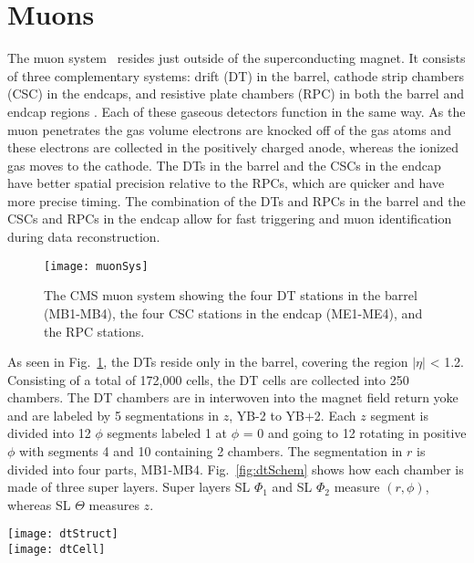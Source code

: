   \section{Muons}
    The muon system~\cite{tCmsE} resides just outside of the superconducting magnet.
    It consists of three complementary systems: drift \DIFdelbegin {}\DIFdelend \DIFaddbegin {}\DIFaddend (DT) in the
      barrel, cathode strip chambers (CSC) in the endcaps, and resistive 
      plate chambers (RPC) in both the barrel and endcap regions \cite{tCmsE}.
    Each of these gaseous detectors function in the same way.
    As the muon penetrates the gas volume electrons are knocked off of the 
      gas atoms and these electrons are collected in the positively charged
      anode, whereas the ionized gas moves to the cathode. 
    The DTs in the barrel and the CSCs in the endcap have better spatial 
      precision relative to the RPCs, which are quicker and have more
      precise timing. 
    The combination of the DTs and RPCs in the barrel and the CSCs and RPCs 
      in the endcap allow for fast triggering and muon identification during
      data reconstruction. 
    \begin{figure}[!Hhbt]
      \centering
      \texttt{[image: muonSys]}
      \caption{ The CMS muon system showing the four DT stations in 
        the barrel (MB1-MB4), the four CSC stations in the endcap (ME1-ME4), 
        and the RPC stations.}
      \label{fig:muonSys}
    \end{figure}

    As seen in Fig.~\ref{fig:muonSys}, the DTs reside only in the barrel, 
      covering the region $|\eta|$ < 1.2.
    Consisting of a total of 172,000 cells, the DT cells are collected into
      250 chambers. 
    The DT chambers are in interwoven into the magnet field return yoke and are
      labeled by 5 segmentations in $z$, YB-2 to YB+2.
    Each $z$ segment is divided into 12 $\phi$ segments labeled 1 at $\phi$ = 0
      and going to 12 rotating in positive $\phi$ with segments 4 and 10 
      containing 2 chambers.
   The segmentation in $r$ is divided into four parts, MB1-MB4.
   Fig.~\ref{fig:dtSchem} shows how each chamber is made of three super layers.
   Super layers SL $\Phi_{1}$ and SL $\Phi_{2}$ measure $(r,\phi)$, whereas 
    SL $\Theta$ measures $z$.
    \begin{figure*}[!Hhbt]
      \centering
      \texttt{[image: dtStruct]} \\
      \texttt{[image: dtCell]}
      \caption{Schematic of the DT chambers and an individual DT cell.}
      \label{fig:dtSchem}
    \end{figure*}

